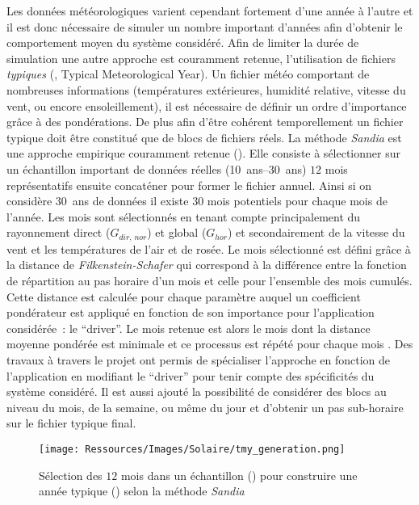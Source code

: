 Les données météorologiques varient cependant fortement d’une année à l’autre et il est
donc nécessaire de simuler un nombre important d’années afin d’obtenir le comportement
moyen du système considéré. Afin de limiter la durée de simulation une autre approche est
couramment retenue, l’utilisation de fichiers \textit{typiques} (, Typical
Meteorological Year). Un fichier météo comportant de nombreuses informations
(températures extérieures, humidité relative, vitesse du vent, ou encore ensoleillement),
il est nécessaire de définir un ordre d’importance grâce à des pondérations. De plus
afin d’être cohérent temporellement un fichier typique doit être constitué que de blocs de
fichiers réels. La méthode \textit{Sandia} \parencite{Hall1978} est une approche empirique
couramment retenue (). Elle consiste à sélectionner sur un
échantillon important de données réelles (\SIrange{10}{30}{ans}) $12$ mois représentatifs
ensuite concaténer pour former le fichier annuel. Ainsi si on considère \SI{30}{ans} de données il existe $30$ mois
potentiels pour chaque mois de l’année. Les mois sont sélectionnés en tenant compte
principalement du rayonnement direct ($G_{dir,\,nor}$) et global ($G_{hor}$) et
secondairement de la vitesse du vent et les températures de l’air et de rosée. Le mois
sélectionné est défini grâce à la distance de \textit{Filkenstein-Schafer} qui correspond
à la différence entre la fonction de répartition au pas horaire d’un mois et celle pour
l’ensemble des mois cumulés. Cette distance est calculée pour chaque paramètre auquel un
coefficient pondérateur est appliqué en fonction de son importance pour l’application
considérée~: le \enquote{driver}. Le mois retenue est alors le mois dont la distance
moyenne pondérée est minimale et ce processus est répété pour chaque mois \parencite{Wilcox2008}.
Des travaux à travers le projet 
ont permis de spécialiser l’approche en fonction de l’application en modifiant le
\enquote{driver} pour tenir compte des spécificités du système considéré. Il est aussi
ajouté la possibilité de considérer des blocs au niveau du mois, de la semaine, ou même du
jour et d’obtenir un pas sub-horaire sur le fichier typique final.

\begin{figure}
    \centering
    \texttt{[image: Ressources/Images/Solaire/tmy\_generation.png]}
    \caption{Sélection des $12$ mois dans un échantillon () pour
             construire une année typique () selon la méthode \textit{Sandia}}
    \label{fig:methode_sandia}
\end{figure}

